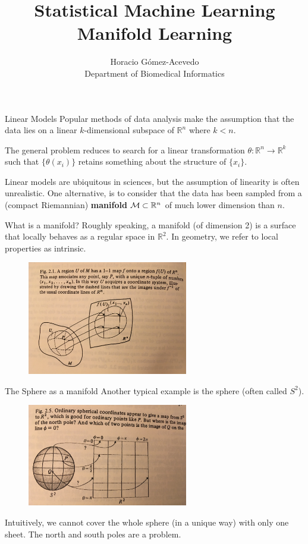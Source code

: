 \documentclass{beamer}
\title{Statistical Machine Learning\\ Manifold Learning}
\author{Horacio G\'omez-Acevedo\\ Department of Biomedical Informatics}
\begin{document}
	\begin{frame}[plain]
		\maketitle
	\end{frame}
\begin{frame}{Linear Models}
	Popular methods of data analysis make the assumption that the data lies on a linear $k$-dimensional subspace of $\mathbb{R}^n$ where $k< n$. 
	
	The general problem reduces to search for a linear transformation $\theta \colon \mathbb{R}^n \to \mathbb{R}^k$ such that $\{\theta(x_i)\}$ retains something about the structure of $\{x_i\}$. 
	
	Linear models are ubiquitous in sciences, but the assumption of linearity is often unrealistic. One alternative, is to consider that the data has been sampled from a (compact Riemannian) \textbf{manifold} ${\cal M}\subset \mathbb{R}^n$ of much lower dimension than $n$. 

\end{frame}

\begin{frame}{What is a manifold?}
	Roughly speaking, a manifold (of dimension 2) is a surface that locally behaves as a regular space in $\mathbb{R}^2$. In geometry, we refer to local properties as intrinsic. 
\begin{figure}[h]
	\centering
	\includegraphics[width=7cm]{../../Figures/fig_manifold.jpg}
\end{figure}	
		
\end{frame}

\begin{frame}{The Sphere as a manifold}
	Another typical example is the sphere (often called $S^2$).
	
\begin{figure}[h]
	\centering
	\includegraphics[width=7cm]{../../Figures/fig_manifold_sphere.jpg}
\end{figure}	
Intuitively, we cannot cover the whole sphere (in a unique way) with only one sheet. The north and south poles are a problem. 

\end{frame}
\end{document}
